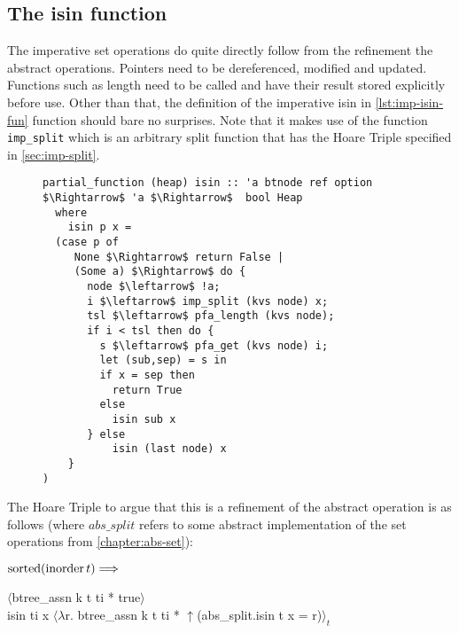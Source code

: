 
\subsection{The isin function}

The imperative set operations do quite directly follow
from the refinement the abstract operations.
Pointers need to be dereferenced, modified and updated.
Functions such as length need to be called and have their result
stored explicitly before use.
Other than that, the definition of the imperative isin in \autoref{lst:imp-isin-fun}
function should bare no surprises.
Note that it makes use of the function \texttt{imp\_split}
which is an arbitrary split function that has the Hoare Triple
specified in \autoref{sec:imp-split}.

\begin{figure}
\begin{lstlisting}[mathescape=true, language=Isabelle, label={lst:imp-isin-fun},
    caption={The imperative isin function}]
partial_function (heap) isin :: 'a btnode ref option $\Rightarrow$ 'a $\Rightarrow$  bool Heap
  where
    isin p x =
  (case p of
     None $\Rightarrow$ return False |
     (Some a) $\Rightarrow$ do {
       node $\leftarrow$ !a;
       i $\leftarrow$ imp_split (kvs node) x;
       tsl $\leftarrow$ pfa_length (kvs node);
       if i < tsl then do {
         s $\leftarrow$ pfa_get (kvs node) i;
         let (sub,sep) = s in
         if x = sep then
           return True
         else
           isin sub x
       } else
           isin (last node) x
    }
)
\end{lstlisting}
\end{figure}

The Hoare Triple to argue that this is a refinement of the abstract operation
is as follows (where $abs\_split$ refers to some abstract implementation
of the set operations from \autoref{chapter:abs-set}):

\begin{lemma} $\operatorname{sorted} (\operatorname{inorder} t) \Longrightarrow$ \\
\begin{center}
   $\langle$btree\_assn k t ti * true$\rangle$ \\
     isin ti x
   $\langle$$\lambda$r. btree\_assn k t ti * $\uparrow$(abs\_split.isin t x = r)$\rangle_t$
\end{center}
\end{lemma}

